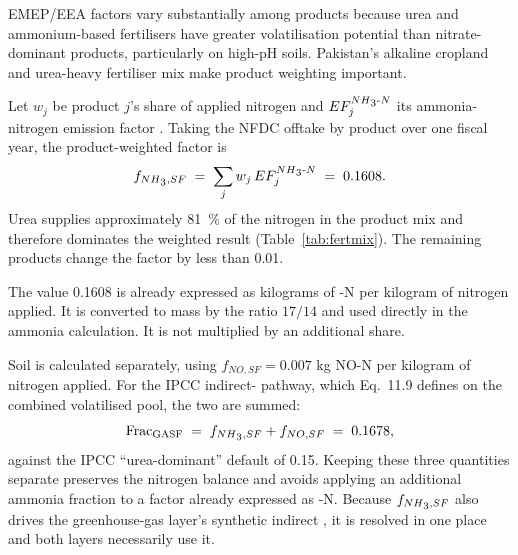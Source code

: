 EMEP/EEA factors vary substantially among products because urea and ammonium-based
fertilisers have greater volatilisation potential than nitrate-dominant products,
particularly on high-pH soils. Pakistan's alkaline cropland and urea-heavy fertiliser mix
make product weighting important.

Let $w_j$ be product $j$'s share of applied nitrogen and $EF^{NH\textsubscript{3}{}\text{-}N}_j$ its
ammonia-nitrogen emission factor \citep{emep2023soils}. Taking the NFDC offtake by product
\citep{nfdc2024} over one fiscal year, the product-weighted factor is
\begin{equation}
f_{NH\textsubscript{3}{},SF} \;=\; \sum_j w_j\, EF^{NH\textsubscript{3}{}\text{-}N}_j \;=\; 0.1608 .
\end{equation}
Urea supplies approximately \SI{81}{\percent} of the nitrogen in the product mix and
therefore dominates the weighted result (Table~\ref{tab:fertmix}). The remaining products
change the factor by less than 0.01.

The value 0.1608 is already expressed as kilograms of \NHthree{}-N per kilogram of nitrogen
applied. It is converted to \NHthree{} mass by the ratio $17/14$ and used directly in the
ammonia calculation. It is not multiplied by an additional \NHthree{} share.

Soil \NOx{} is calculated separately, using $f_{NO,SF}=0.007$ kg NO-N per kilogram of
nitrogen applied. For the IPCC indirect-\NtwoO{} pathway, which Eq.~11.9 defines on the
combined volatilised pool, the two are summed:
\begin{equation}
\mathrm{Frac_{GASF}} \;=\; f_{NH\textsubscript{3}{},SF} + f_{NO,SF} \;=\; 0.1678 ,
\end{equation}
against the IPCC ``urea-dominant'' default of 0.15. Keeping these three quantities separate
preserves the nitrogen balance and avoids applying an additional ammonia fraction to a
factor already expressed as \NHthree{}-N. Because $f_{NH\textsubscript{3}{},SF}$ also drives the
greenhouse-gas layer's synthetic indirect \NtwoO{}, it is resolved in one place and both
layers necessarily use it.

